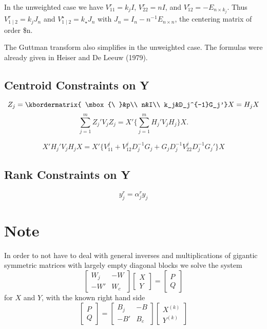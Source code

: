\documentclass[
  12pt,
]{article}
\begin{document}
In the unweighted case we have \(V_{11}^r=k_jI\), \(V_{22}^r=nI\), and
\(V_{12}^r=-E_{n\times k_j}\). Thus
\(V_{1\mid2}^r=k_jJ_n\) and \(V_{1\mid 2}^\star=k_\star J_n\)
with \(J_n=I_n-n^{-1}E_{n\times n}\), the centering matrix of order \$n.

The Guttman transform also simplifies in the unweighted case. The formulas were already given in Heiser and De Leeuw (1979).

\subsection{Centroid Constraints on Y}\label{centroid-constraints-on-y}

\[
Z_j=
\kbordermatrix{
\mbox{\ }&p\\
n&I\\
k_j&D_j^{-1}G_j'}X=H_jX
\]
\[
\sum_{j=1}^m Z_j'V_jZ_j=X'\{\sum_{j=1}^mH_j'V_jH_j\}X.
\]

\[
X'H_j'V_jH_jX=X'\{V_{11}^j+V_{12}^jD_j^{-1}G_j+G_jD_j^{-1}V_{22}^jD_j^{-1}G_j'\}X
\]

\subsection{Rank Constraints on Y}\label{rank-constraints-on-y}

\[
y_j^r=\alpha_{j}^ry_j
\]

\section{Note}\label{note}

In order to not have to deal with general inverses and multiplications of gigantic symmetric matrices with largely empty diagonal blocks we solve the system
\[
\begin{bmatrix}
W_j&-W\\
-W'&W_c
\end{bmatrix}
\begin{bmatrix}
X\\Y
\end{bmatrix}
=
\begin{bmatrix}
P\\Q
\end{bmatrix}
\]
for \(X\) and \(Y\), with the known right hand side
\[
\begin{bmatrix}P\\Q\end{bmatrix}=
\begin{bmatrix}
B_j&-B\\
-B'&B_c
\end{bmatrix}
\begin{bmatrix}
X^{(k)}\\Y^{(k)}
\end{bmatrix}
\]
\end{document}
